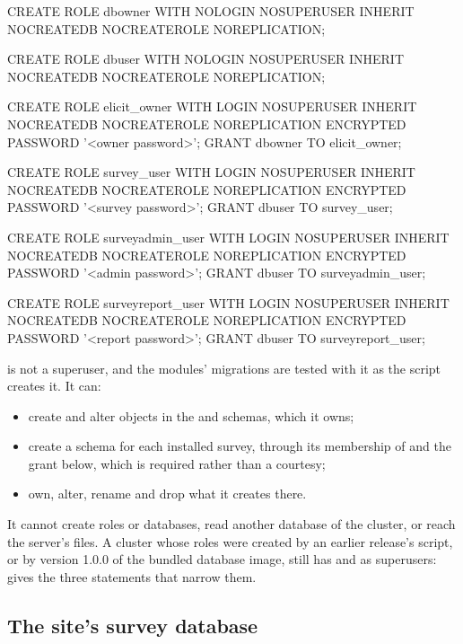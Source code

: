 \documentclass[11pt, a4paper]{article}
\begin{document}
\begin{elicitsql}
CREATE ROLE dbowner WITH NOLOGIN NOSUPERUSER INHERIT
  NOCREATEDB NOCREATEROLE NOREPLICATION;

CREATE ROLE dbuser WITH NOLOGIN NOSUPERUSER INHERIT
  NOCREATEDB NOCREATEROLE NOREPLICATION;

CREATE ROLE elicit_owner WITH LOGIN NOSUPERUSER INHERIT
  NOCREATEDB NOCREATEROLE NOREPLICATION
  ENCRYPTED PASSWORD '<owner password>';
GRANT dbowner TO elicit_owner;

CREATE ROLE survey_user WITH LOGIN NOSUPERUSER INHERIT
  NOCREATEDB NOCREATEROLE NOREPLICATION
  ENCRYPTED PASSWORD '<survey password>';
GRANT dbuser TO survey_user;

CREATE ROLE surveyadmin_user WITH LOGIN NOSUPERUSER INHERIT
  NOCREATEDB NOCREATEROLE NOREPLICATION
  ENCRYPTED PASSWORD '<admin password>';
GRANT dbuser TO surveyadmin_user;

CREATE ROLE surveyreport_user WITH LOGIN NOSUPERUSER INHERIT
  NOCREATEDB NOCREATEROLE NOREPLICATION
  ENCRYPTED PASSWORD '<report password>';
GRANT dbuser TO surveyreport_user;
\end{elicitsql}

\begin{elicitnote}
 is not a superuser, and the modules' migrations are tested with it as the
script creates it. It can:
\begin{itemize}
  \item create and alter objects in the  and  schemas, which it
        owns;
  \item create a schema for each installed survey, through its membership of 
        and the  grant below, which is required rather than a
        courtesy;
  \item own, alter, rename and drop what it creates there.
\end{itemize}
It cannot create roles or databases, read another database of the cluster, or reach the
server's files. A cluster whose roles were created by an earlier release's script, or by
version 1.0.0 of the bundled database image, still has  and  as
superusers:  gives the three statements that narrow them.
\end{elicitnote}

\subsection{The site's survey database}
\end{document}
